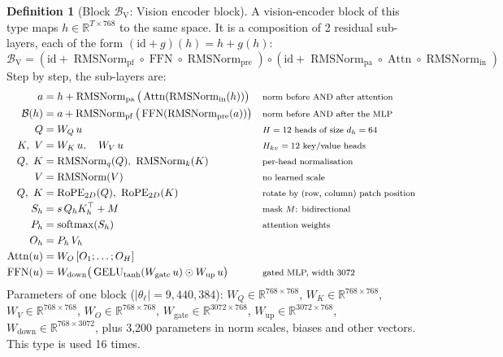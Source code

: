 \documentclass[10pt,a4paper]{article}
\newcommand{\op}[1]{\operatorname{#1}}
\theoremstyle{definition}
\newtheorem{definition}{Definition}[section]
\begin{document}
\begin{definition}[Block $\mathcal{B}_{\mathrm{V}}$: Vision encoder block]
A vision-encoder block of this type maps $h\in\mathbb{R}^{T\times 768}$ to the same space. It is a composition of 2 residual sub-layers, each of the form $(\mathrm{id}+g)(h)=h+g(h)$:
\begin{equation}
  \mathcal{B}_{\mathrm{V}} = (\mathrm{id}+\op{RMSNorm}_{\mathrm{pf}}\circ\op{FFN}\circ \op{RMSNorm}_{\mathrm{pre}})\circ(\mathrm{id}+\op{RMSNorm}_{\mathrm{pa}}\circ \op{Attn}\circ \op{RMSNorm}_{\mathrm{in}})
\end{equation}
Step by step, the sub-layers are:
\begin{align*}
  a &= h + \op{RMSNorm}_{\mathrm{pa}}\big(\op{Attn}(\op{RMSNorm}_{\mathrm{in}}(h))\big) && \text{\footnotesize norm before AND after attention} \\
  \mathcal{B}(h) &= a + \op{RMSNorm}_{\mathrm{pf}}\big(\op{FFN}(\op{RMSNorm}_{\mathrm{pre}}(a))\big) && \text{\footnotesize norm before AND after the MLP} \\
  Q &= W_Q\,u && \text{\footnotesize $H=12$ heads of size $d_h=64$} \\
  K,\ V &= W_K\,u,\quad W_V\,u && \text{\footnotesize $H_{kv}=12$ key/value heads} \\
  Q,\ K &= \op{RMSNorm}_q(Q),\ \op{RMSNorm}_k(K) && \text{\footnotesize per-head normalisation} \\
  V &= \op{RMSNorm}(V) && \text{\footnotesize no learned scale} \\
  Q,\ K &= \op{RoPE}_{2D}(Q),\ \op{RoPE}_{2D}(K) && \text{\footnotesize rotate by (row, column) patch position} \\
  S_h &= s\, Q_h K_h^{\top} + M && \text{\footnotesize mask $M$: bidirectional} \\
  P_h &= \op{softmax}(S_h) && \text{\footnotesize attention weights} \\
  O_h &= P_h\, V_h \\
  \op{Attn}(u) &= W_O\,[O_1;\dots;O_H] \\
  \op{FFN}(u) &= W_{\mathrm{down}}\big(\op{GELU}_{\tanh}(W_{\mathrm{gate}}\,u)\odot W_{\mathrm{up}}\,u\big) && \text{\footnotesize gated MLP, width 3072}
\end{align*}
Parameters of one block ($|\theta_\ell|=9{,}440{,}384$): $W_Q\in\mathbb{R}^{768\times768}$, $W_K\in\mathbb{R}^{768\times768}$, $W_V\in\mathbb{R}^{768\times768}$, $W_O\in\mathbb{R}^{768\times768}$, $W_{\mathrm{gate}}\in\mathbb{R}^{3072\times768}$, $W_{\mathrm{up}}\in\mathbb{R}^{3072\times768}$, $W_{\mathrm{down}}\in\mathbb{R}^{768\times3072}$, plus 3,200 parameters in norm scales, biases and other vectors. This type is used 16 times.
\end{definition}
\end{document}
